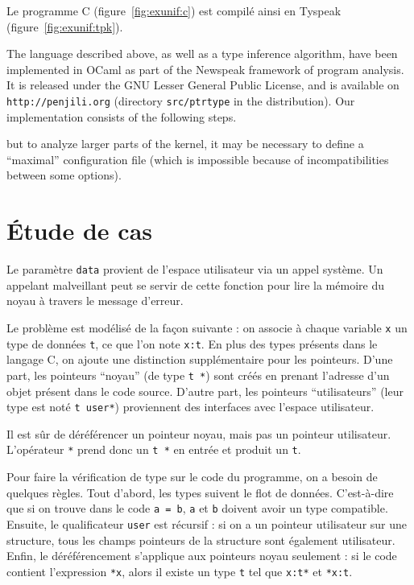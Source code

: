 Le programme C (figure~\ref{fig:exunif:c}) est compilé ainsi en Tyspeak
(figure~\ref{fig:exunif:tpk}).

\clearpage


The language described above, as well as a type inference algorithm, have been
implemented in OCaml as part of the Newspeak framework of program
analysis\cite{newspeak}. It is released under the GNU Lesser General Public
License, and is available on \texttt{http://penjili.org} (directory
\texttt{src/ptrtype} in the distribution). Our implementation consists of the
following steps.

but to analyze larger parts of the kernel, it may be
necessary to define a ``maximal'' configuration file (which is impossible
because of incompatibilities between some options).%

\section{Étude de cas}%

Le paramètre \texttt{data} provient de l'espace utilisateur via un appel
système. Un appelant malveillant peut se servir de cette fonction pour lire la
mémoire du noyau à travers le message d'erreur.

Le problème est modélisé de la façon suivante : on associe à chaque variable
\texttt{x} un type de données \texttt{t}, ce que l'on note \texttt{x:t}. En
plus des types présents dans le langage C, on ajoute une distinction
supplémentaire pour les pointeurs. D'une part, les pointeurs ``noyau'' (de type
\texttt{t~*}) sont créés en prenant l'adresse d'un objet présent dans le code
source. D'autre part, les pointeurs ``utilisateurs'' (leur type est noté
\texttt{t user*}) proviennent des interfaces avec l'espace utilisateur.

Il est sûr de déréférencer un pointeur noyau, mais pas un pointeur
utilisateur. L'opérateur \texttt{*} prend donc un \texttt{t *} en entrée
et produit un \texttt{t}.

Pour faire la vérification de type sur le code du programme, on a besoin de
quelques règles. Tout d'abord, les types suivent le flot de données.
C'est-à-dire que si on trouve dans le code \texttt{a = b}, \texttt{a} et
\texttt{b} doivent avoir un type compatible. Ensuite, le qualificateur
\texttt{user} est récursif : si on a un pointeur utilisateur sur une structure,
tous les champs pointeurs de la structure sont également utilisateur. Enfin, le
déréférencement s'applique aux pointeurs noyau seulement : si le code contient
l'expression \texttt{*x}, alors il existe un type \texttt{t} tel que
\texttt{x:t*} et \texttt{*x:t}.

